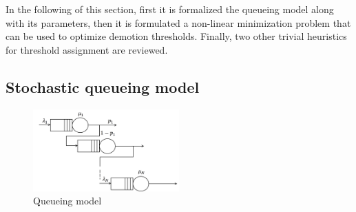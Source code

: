 In the following of this section, first it is formalized the queueing model along with its parameters, then it is formulated a non-linear minimization problem that can be used to optimize demotion thresholds. Finally, two other trivial heuristics for threshold assignment are reviewed.

\subsection{Stochastic queueing model}
\begin{figure}
	\centering
	\includegraphics[width=0.5\textwidth]{Chapter2/Figures/pias}
	\caption{Queueing model}
	\label{fig:pias}
\end{figure}

